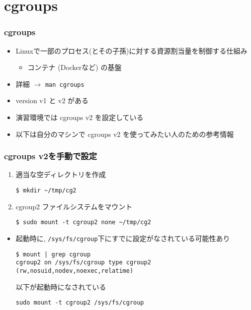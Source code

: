 \documentclass[12pt,dvipdfmx]{beamer}
\begin{document}
\section{cgroups}

\begin{frame}
  \frametitle{cgroups}
  \begin{itemize}
  \item Linuxで一部のプロセス(とその子孫)に対する資源割当量を制御する仕組み
    \begin{itemize}
    \item コンテナ (Dockerなど) の基盤
    \end{itemize}
  \item 詳細 $\rightarrow$ {\tt man cgroups}
  \item version v1 と v2 がある
  \item 演習環境では cgroups v2 を設定している
  \item 以下は自分のマシンで cgroups v2 を使ってみたい人のための参考情報
  \end{itemize}
\end{frame}

\begin{frame}[fragile]
  \frametitle{cgroups v2を手動で設定}
  \begin{enumerate}
  \item 適当な空ディレクトリを作成
\begin{lstlisting}
$ mkdir ~/tmp/cg2
\end{lstlisting} %
  \item cgroup2 ファイルシステムをマウント
\begin{lstlisting}
$ sudo mount -t cgroup2 none ~/tmp/cg2
\end{lstlisting} %
\end{enumerate}
\begin{itemize}
\item 起動時に, {\tt /sys/fs/cgroup}下にすでに設定がなされている可能性あり
\begin{lstlisting}
$ mount | grep cgroup
cgroup2 on /sys/fs/cgroup type cgroup2 (rw,nosuid,nodev,noexec,relatime)
\end{lstlisting} %
以下が起動時になされている
\begin{lstlisting}
sudo mount -t cgroup2 /sys/fs/cgroup
\end{lstlisting}
\end{itemize}
\end{frame}
\end{document}
